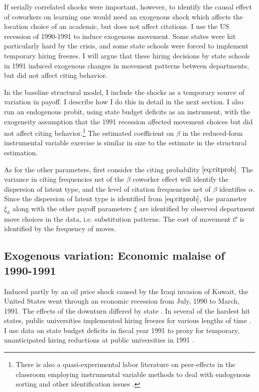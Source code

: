 If serially correlated shocks were important, however, to identify the
causal effect of coworkers on learning one would need an exogenous shock
which affects the location choice of an academic, but does not affect
citations.  I use the US recession of 1990-1991 to induce exogenous
movement. Some states were hit particularly hard by the crisis, and some
state schools were forced to implement temporary hiring freezes. I will
argue that these hiring decisions by state schools in 1991 induced
exogenous changes in movement patterns between departments, but did not
affect citing behavior.

In the baseline structural model, I include the shocks as a temporary
source of variation in payoff. I describe how I do this in detail
in the next section.  I also run an endogenous probit, using state budget
deficits as an instrument, with the exogeneity assumption that the 1991
recession affected movement choices but did not affect citing behavior.\footnote{
There is also a quasi-experimental labor literature
 on peer-effects in the classroom employing instrumental variable 
methods to deal with endogenous sorting and other identification issues 
\citep{kang2007classroom, de2010identification}.}
The estimated coefficient on $\beta$ in the reduced-form instrumental variable
exercise is similar in size to the estimate in the structural 
estimation.

As for the other parameters, first consider the citing probability
$\eqref{eq:citprob}$. The variance in citing frequencies net of the
$\beta$ coworker effect will identify the dispersion of latent type, and
the level of citation frequencies net of $\beta$ identifies $\alpha$.
Since the dispersion of latent type is identified from
$\eqref{eq:citprob}$, the parameter $\xi_h$ along with the other payoff
parameters $\xi$ are identified by observed department move choices in the data, i.e.
substitution patterns. The cost of movement $\mathcal{C}$ is
identified by the frequency of moves.

\subsection{Exogenous variation: Economic malaise of 1990-1991}

Induced partly by an oil price shock caused by the Iraqi invasion of
Kuwait, the United States went through an economic recession from July,
1990 to March, 1991. The effects of the downturn differed by state
\citep{wapo1991public, moore1991state}. In several of the hardest hit
states, public universities implemented hiring freezes for various
lengths of time
\citep{latimes1991golden, moneymag1991paying, uvermont2013presidential}.
I use data on state budget deficits in fiscal year 1991 to proxy for
temporary, unanticipated hiring reductions at public universities in
1991 \citep{gold1995fiscal}.

